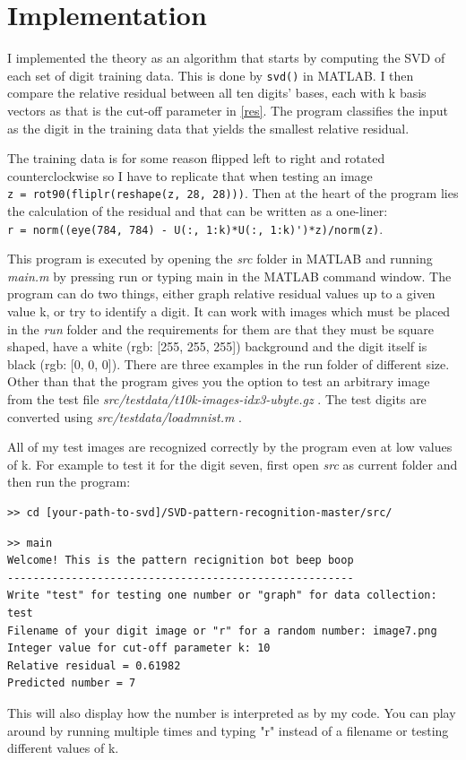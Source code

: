 \documentclass[notitlepage]{report}
\begin{document}
\newpage

\section{Implementation}

I implemented the theory as an algorithm that starts by computing the SVD of each set of digit training data. This is done by \verb|svd()| in MATLAB. I then compare the relative residual between all ten digits' bases, each with k basis vectors as that is the cut-off parameter in \eqref{res}. The program classifies the input as the digit in the training data that yields the smallest relative residual. 

The training data is for some reason flipped left to right and rotated counterclockwise so I have to replicate that when testing an image \\
\verb|z = rot90(fliplr(reshape(z, 28, 28)))|. Then at the heart of the program lies the calculation of the residual and that can be written as a one-liner:\\ 
\verb|r = norm((eye(784, 784) - U(:, 1:k)*U(:, 1:k)')*z)/norm(z)|.

This program is executed by opening the \textit{src} folder in MATLAB and running \textit{main.m} by pressing run or typing main in the MATLAB command window. The program can do two things, either graph relative residual values up to a given value k, or try to identify a digit. It can work with images which must be placed in the \textit{run} folder and the requirements for them are that they must be square shaped, have a white (rgb: [255, 255, 255]) background and the digit itself is black (rgb: [0, 0, 0]). There are three examples in the run folder of different size. Other than that the program gives you the option to test an arbitrary image from the test file \textit{src/testdata/t10k-images-idx3-ubyte.gz} \cite{nistdata}. The test digits are converted using \textit{src/testdata/loadmnist.m} \cite{loadmnist}.

All of my test images are recognized correctly by the program even at low values of k. For example to test it for the digit seven, first open \textit{src} as current folder and then run the program:
\begin{verbatim}
>> cd [your-path-to-svd]/SVD-pattern-recognition-master/src/
\end{verbatim}
\begin{verbatim}
>> main
Welcome! This is the pattern recignition bot beep boop
------------------------------------------------------
Write "test" for testing one number or "graph" for data collection: test
Filename of your digit image or "r" for a random number: image7.png
Integer value for cut-off parameter k: 10
Relative residual = 0.61982
Predicted number = 7
\end{verbatim}
This will also display how the number is interpreted as by my code. You can play around by running multiple times and typing "r" instead of a filename or testing different values of k.
\end{document}
